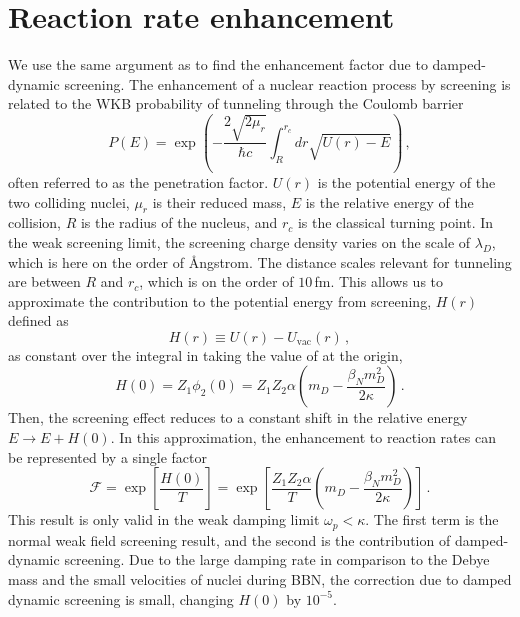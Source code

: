 \section{Reaction rate enhancement}
We use the same argument as \cite{Salpeter:1954nc} to find the enhancement factor due to damped-dynamic screening. The enhancement of a nuclear reaction process by screening is related to the WKB probability of tunneling through the Coulomb barrier
\begin{equation} \label{eq:penprob}
    P(E) = \exp{\left( - \frac{2\sqrt{2 \mu_r}}{\hbar c}\int_{R}^{r_c}dr \sqrt{U(r)-E}\right)}\,,
\end{equation}
often referred to as the penetration factor. $U(r)$ is the potential energy of the two colliding nuclei, $\mu_r$ is their reduced mass, $E$ is the relative energy of the collision, $R$ is the radius of the nucleus, and $r_c$ is the classical turning point. In the weak screening limit, the screening charge density varies on the scale of $\lambda_D$, which is here on the order of \AA ngstrom. The distance scales relevant for tunneling are between $R$ and $r_c$, which is on the order of $10\,$fm. This allows us to approximate the contribution to the potential energy from screening, $H(r)$ defined as
\begin{equation}
    H(r) \equiv U(r) - U_\text{vac}(r)\,,
\end{equation}
as constant over the integral in  taking the value of  at the origin,
\begin{equation}
     H(0) = Z_1\phi_2(0) = Z_1 Z_2 \alpha \left(m_D - \frac{\beta_N m_D^2}{2 \kappa}\right)\,.
\end{equation}
Then, the screening effect reduces to a constant shift in the relative energy $E \rightarrow E+H(0)$. In this approximation, the enhancement to reaction rates can be represented by a single factor \cite{Salpeter:1954nc,Kravchuk:2014sps}
\begin{equation}\label{eq:DDSenhance}
   \mathcal{F} = \exp\left[\frac{H(0)}{T} \right]=\exp\left[\frac{Z_1 Z_2 \alpha}{T} \left(m_D - \frac{\beta_N m_D^2}{2 \kappa}\right)\right]\,.
\end{equation}
This result is only valid in the weak damping limit $\omega_p<\kappa$. The first term is the normal weak field screening result, and the second is the contribution of damped-dynamic screening. Due to the large damping rate in comparison to the Debye mass and the small velocities of nuclei  during BBN, the correction due to damped dynamic screening is small, changing $H(0)$ by $10^{-5}$. 
